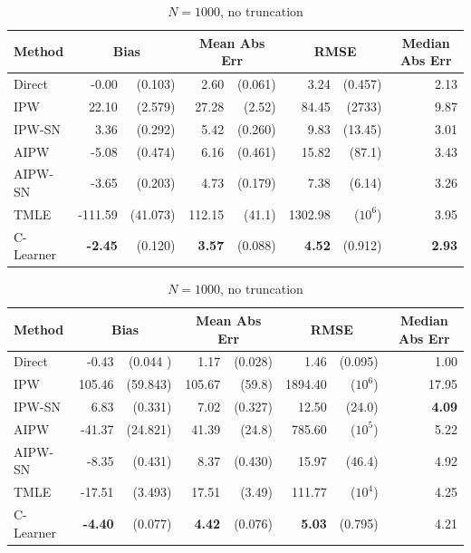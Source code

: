 \begin{table}[H]
\footnotesize
\vspace{-0.5cm}
\begin{subtable}{\linewidth}
\centering
\caption{$N=200$, no truncation} 
\begin{tabular}{lrrrrrrr}
\toprule
Method &  \multicolumn{2}{c}{Bias} &  \multicolumn{2}{c}{Mean Abs Err} &  \multicolumn{2}{c}{RMSE} &  \multicolumn{1}{c}{Median Abs Err} \\
\midrule
Direct & -0.00 & (0.103) & 2.60 & (0.061) & 3.24 & (0.457) & 2.13 \\
IPW & 22.10 & (2.579) & 27.28 & (2.52)& 84.45 & (2733) & 9.87 \\ 
IPW-SN & 3.36 &(0.292) & 5.42 & (0.260) & 9.83 & (13.45) & 3.01 \\ 
\greymidrule
AIPW & -5.08 & (0.474) & 6.16 & (0.461) & 15.82 & (87.1) & 3.43 \\ 
AIPW-SN & -3.65 & (0.203) & 4.73 & (0.179) & 7.38 & (6.14) & 3.26 \\ 
TMLE & -111.59 & (41.073) & 112.15 & (41.1) & 1302.98 & ($10^6$) & 3.95 \\ 
C-Learner & \textbf{-2.45} & (0.120) & \textbf{3.57} & (0.088) & \textbf{4.52} & (0.912) & \textbf{2.93} \\ 
\bottomrule
\end{tabular}
\end{subtable}

\begin{subtable}{\linewidth}
\centering
\caption{$N=1000$, no truncation} %
\begin{tabular}{lrrrrrrr}
\toprule
Method & \multicolumn{2}{c}{Bias} &  \multicolumn{2}{c}{Mean Abs Err} &  \multicolumn{2}{c}{RMSE} &  \multicolumn{1}{c}{Median Abs Err} \\
\midrule
Direct & -0.43 & (0.044 )& 1.17 & (0.028) & 1.46 & (0.095) & 1.00 \\
IPW & 105.46 & (59.843) & 105.67 & (59.8) & 1894.40 & ($10^6$) & 17.95 \\ 
IPW-SN & 6.83 & (0.331) & 7.02 & (0.327) & 12.50 & (24.0) & \textbf{4.09} \\
\greymidrule
AIPW & -41.37 & (24.821) & 41.39 & (24.8) & 785.60 & ($10^5$) & 5.22 \\ 
AIPW-SN & -8.35 & (0.431) & 8.37 & (0.430) & 15.97 & (46.4) & 4.92 \\
TMLE & -17.51 & (3.493) & 17.51 & (3.49) & 111.77 & ($10^4$) & 4.25 \\ 
C-Learner & \textbf{-4.40} & (0.077) & \textbf{4.42} & (0.076) & \textbf{5.03} & (0.795) & 4.21 \\ 
\bottomrule
\end{tabular}
\end{subtable}


\end{table}

